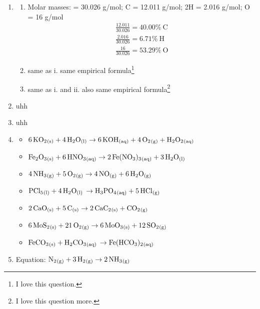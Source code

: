 \documentclass[a4paper, 12pt]{article}
\newcommand{\lab}[1]{\: \text{#1}}
\begin{document}
\begin{enumerate}[label=\alph*.]
\begin{enumerate}[label=\roman*.]
\item 
\begin{gather*}
\text{Molar mass of \ce{Fe2O3}} = 159.687 \lab{g/mol} \\
150 \lab{g} = \frac{1 \lab{mol}}{159.687 \lab{g}} \approx \boxed{0.94 \lab{mol}}
\end{gather*}
\item
\begin{gather*}
\text{Molar mass of \ce{NO2}} = 46.01 \lab{g/mol} \\
10 \lab{mg} \times \frac{1 \lab{g}}{1000 \lab{mg}} \times \frac{1 \lab{mol}}{46.01 \lab{g}} \approx \boxed{0.000217 \lab{mol}}
\end{gather*}
\item
\begin{gather*}
\text{Molar mass of \ce{BF3}} = 67.81 \lab{g/mol} \\
1.5 \times 10^{16} \lab{molecules} \times \frac{1 \lab{mol}}{6.022 \times 10^{23} \lab{molecules}} \times \frac{67.81 \lab{g}}{1 \lab{mol}} \approx \boxed{0.00000169 \lab{mol}}
\end{gather*}
\end{enumerate}
\item
\begin{enumerate}[label=\roman*.]
\item Molar masses:  = 30.026 g/mol; C = 12.011 g/mol; 2H = 2.016 g/mol; O = 16 g/mol
\begin{gather*}
\frac{12.011}{30.026} = 40.00\% \lab{C} \\
\frac{2.016}{30.026} = 6.71\% \lab{H} \\
\frac{16}{30.026} = 53.29\% \lab{O}
\end{gather*}
\item same as i. same empirical formula\footnote{I love this question.}
\item same as i. and ii. also same empirical formula\footnote{I love this question more.}
\end{enumerate}
\item uhh
\item uhh
\item 
\begin{itemize}
\item $\ce{6KO2_{(s)}} + \ce{4H2O_{(l)}} \to \ce{6KOH_{(aq)}} + \ce{4O2_{(g)}} + \ce{H2O2_{(aq)}}$
\item $\ce{Fe2O3_{(s)}} + \ce{6HNO3_{(aq)}} \to \ce{2Fe(NO3)3_{(aq)}} + \ce{3H2O_{(l)}}$
\item $\ce{4NH3_{(g)}} + \ce{5O2_{(g)}} \to \ce{4NO_{(g)}} + \ce{6H2O_{(g)}}$
\item $\ce{PCl5_{(l)} + 4H2O_{(l)} \to H3PO4_{(aq)} + 5HCl_{(g)}}$
\item $\ce{2CaO_{(s)} + 5C_{(s)}} \to \ce{2CaC2_{(s)} + CO2_{(g)}}$
\item $\ce{6MoS2_{(s)} + 21O2_{(g)}} \to \ce{6MoO3_{(s)} + 12SO2_{(g)}}$
\item $\ce{FeCO3_{(s)} + H2CO3_{(aq)} \to Fe(HCO3)2_{(aq)}}$
\end{itemize}
\item Equation: $\ce{N2_{(g)} + 3H2_{(g)}} \to \ce{2NH3_{(g)}}$


\end{enumerate}
\end{document}
